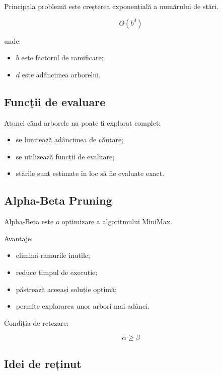\documentclass[12pt,a4paper]{article}
\begin{document}
Principala problemă este creșterea exponențială a numărului de stări.

\[
O(b^d)
\]

unde:

\begin{itemize}
\item $b$ este factorul de ramificare;
\item $d$ este adâncimea arborelui.
\end{itemize}

\subsection{Funcții de evaluare}

Atunci când arborele nu poate fi explorat complet:

\begin{itemize}
\item se limitează adâncimea de căutare;
\item se utilizează funcții de evaluare;
\item stările sunt estimate în loc să fie evaluate exact.
\end{itemize}

\subsection{Alpha-Beta Pruning}

Alpha-Beta este o optimizare a algoritmului MiniMax.

Avantaje:

\begin{itemize}
\item elimină ramurile inutile;
\item reduce timpul de execuție;
\item păstrează aceeași soluție optimă;
\item permite explorarea unor arbori mai adânci.
\end{itemize}

Condiția de retezare:

\[
\alpha \geq \beta
\]

\subsection{Idei de reținut}
\end{document}
